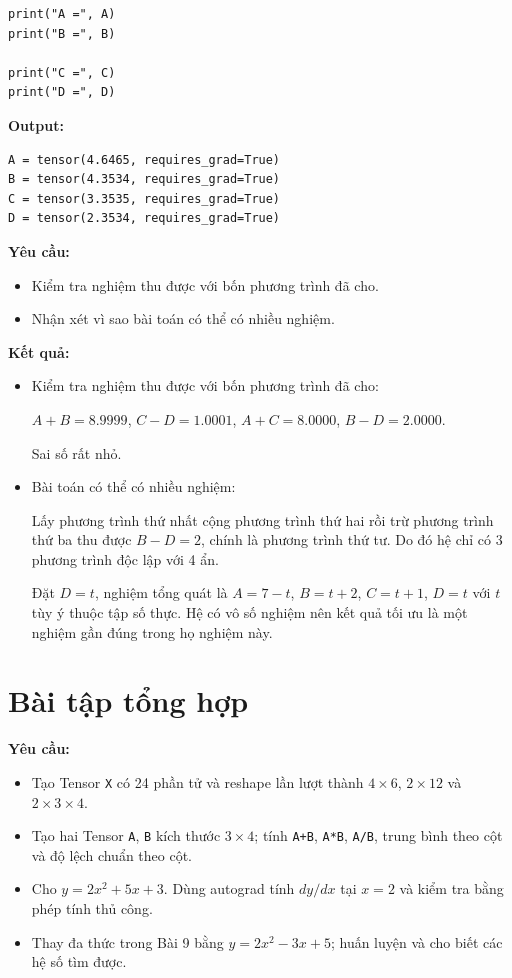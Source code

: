\documentclass[12pt,a4paper]{article}
\begin{document}
\begin{itemize}
\begin{verbatim}
print("A =", A)
print("B =", B)

print("C =", C)
print("D =", D)
\end{verbatim}

\textbf{Output:}
\begin{verbatim}
A = tensor(4.6465, requires_grad=True)
B = tensor(4.3534, requires_grad=True)
C = tensor(3.3535, requires_grad=True)
D = tensor(2.3534, requires_grad=True)
\end{verbatim}

\textbf{Yêu cầu:}
\begin{itemize}
    \item Kiểm tra nghiệm thu được với bốn phương trình đã cho.
    \item Nhận xét vì sao bài toán có thể có nhiều nghiệm.
\end{itemize}

\textbf{Kết quả:}
\begin{itemize}
    \item Kiểm tra nghiệm thu được với bốn phương trình đã cho:
    
    $A+B=8.9999$, $C-D=1.0001$, $A+C=8.0000$, $B-D=2.0000$. 
    
    Sai số rất nhỏ.

    \item Bài toán có thể có nhiều nghiệm:

    Lấy phương trình thứ nhất cộng phương trình thứ hai rồi trừ phương trình thứ ba thu được $B-D=2$, chính là phương trình thứ tư. Do đó hệ chỉ có 3 phương trình độc lập với 4 ẩn.

    Đặt $D=t$, nghiệm tổng quát là $A=7-t$, $B=t+2$, $C=t+1$, $D=t$ với $t$ tùy ý thuộc tập số thực. Hệ có vô số nghiệm nên kết quả tối ưu là một nghiệm gần đúng trong họ nghiệm này.
\end{itemize}
    
    

\section{Bài tập tổng hợp}
\textbf{Yêu cầu:}
\begin{itemize}
    \item Tạo Tensor \texttt{X} có 24 phần tử và reshape lần lượt thành $4\times6$, $2\times12$ và $2\times3\times4$.
    \item Tạo hai Tensor \texttt{A}, \texttt{B} kích thước $3\times4$; tính \texttt{A+B}, \texttt{A*B}, \texttt{A/B}, trung bình theo cột và độ lệch chuẩn theo cột.
    \item Cho $y=2x^2+5x+3$. Dùng autograd tính $dy/dx$ tại $x=2$ và kiểm tra bằng phép tính thủ công.
    \item Thay đa thức trong Bài 9 bằng $y=2x^2-3x+5$; huấn luyện và cho biết các hệ số tìm được.
\end{itemize}


\end{itemize}
\end{document}
